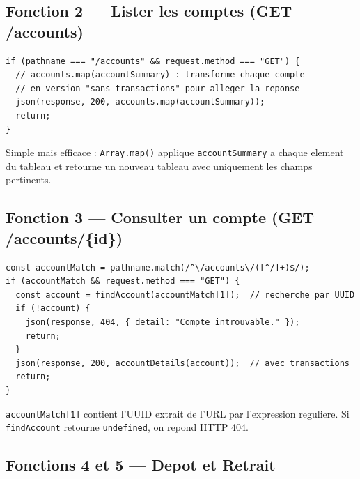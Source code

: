 \documentclass[12pt,a4paper]{article}
\begin{document}
\subsection{Fonction 2 --- Lister les comptes (GET /accounts)}

\begin{lstlisting}[style=js, caption={server.js --- GET /accounts}]
if (pathname === "/accounts" && request.method === "GET") {
  // accounts.map(accountSummary) : transforme chaque compte
  // en version "sans transactions" pour alleger la reponse
  json(response, 200, accounts.map(accountSummary));
  return;
}
\end{lstlisting}

Simple mais efficace : \texttt{Array.map()} applique \texttt{accountSummary} a chaque element du tableau et retourne un nouveau tableau avec uniquement les champs pertinents.

\subsection{Fonction 3 --- Consulter un compte (GET /accounts/\{id\})}

\begin{lstlisting}[style=js, caption={server.js --- GET /accounts/\{account\_id\}}]
const accountMatch = pathname.match(/^\/accounts\/([^/]+)$/);
if (accountMatch && request.method === "GET") {
  const account = findAccount(accountMatch[1]);  // recherche par UUID
  if (!account) {
    json(response, 404, { detail: "Compte introuvable." });
    return;
  }
  json(response, 200, accountDetails(account));  // avec transactions
  return;
}
\end{lstlisting}

\texttt{accountMatch[1]} contient l'UUID extrait de l'URL par l'expression reguliere. Si \texttt{findAccount} retourne \texttt{undefined}, on repond HTTP 404.

\subsection{Fonctions 4 et 5 --- Depot et Retrait}
\end{document}
